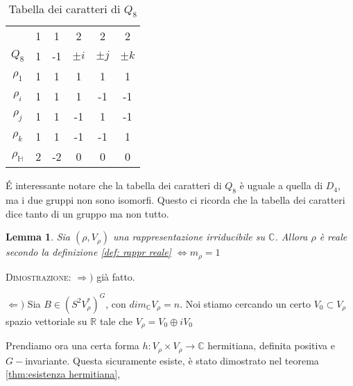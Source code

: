 \documentclass[11pt]{article}
\theoremstyle{plain}
\newtheorem{lemma}[thm]{Lemma}
\theoremstyle{definition}
\theoremstyle{remark}
\newcommand{\C}{\mathbb{C}}
\newcommand{\R}{\mathbb{R}}
\newcommand{\HH}{\mathbb{H}}
\begin{document}
\begin{table}[!ht]
\centering
\begin{tabular}{|c|c|c|c|c|c|}
\hline
& 1 & 1 & 2 & 2 & 2 \\
$Q_8$ & 1 & -1 & $\pm i$ & $\pm j$ & $\pm k$ \\
\hline
$\rho_1$ & 1 & 1 & 1 & 1 & 1 \\
\hline
$\rho_i$ & 1 & 1 & 1 & -1 & -1 \\
\hline
$\rho_j$ & 1 & 1 & -1 & 1 & -1 \\
\hline
$\rho_k$ & 1 & 1 & -1 & -1 & 1 \\
\hline
$\rho_\HH$ & 2 & -2 & 0 & 0 & 0 \\
\hline
\end{tabular}
\caption{Tabella dei caratteri di $Q_8$}
\label{tab: caratteri q8}
\end{table}


\'E interessante notare che la tabella dei caratteri di $Q_8$ è uguale a quella di $D_4$, ma i due gruppi non sono isomorfi. Questo ci ricorda che la tabella dei caratteri dice tanto di un gruppo ma non tutto.













\begin{lemma}
Sia $(\rho, V_\rho)$ una rappresentazione irriducibile su $\C$. Allora $\rho$ è reale secondo la definizione \ref{def: rappr reale} $\Leftrightarrow m_\rho = 1$ 
\end{lemma}

\textsc{Dimostrazione:} $\Rightarrow)$ già fatto.

$\Leftarrow)$ Sia $B \in (S^2V_\rho^*)^G$, con $dim_\C V_\rho = n$. Noi stiamo cercando un certo $V_0 \subset V_\rho$ spazio vettoriale su $\R$ tale che $V_\rho = V_0 \oplus i V_0$ 

Prendiamo ora una certa forma $h : V_\rho \times V_\rho \to \C$ hermitiana, definita positiva e $G-$invariante. Questa sicuramente esiste, è stato dimostrato nel teorema \ref{thm:esistenza hermitiana},
\end{document}
